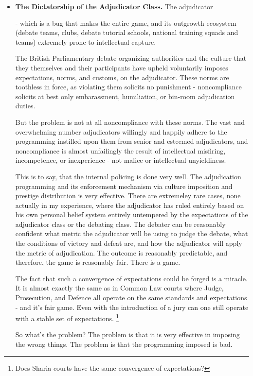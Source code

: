 \begin{itemize}
    \item \textbf{The Dictatorship of the Adjudicator Class.} The adjudicator 
    
    - which is a bug that makes the entire game, and its outgrowth ecosystem (debate teams, clubs, debate tutorial schools, national training squads and teams) extremely prone to intellectual capture.

    The British Parliamentary debate organizing authorities and the culture that they themselves and their participants have upheld voluntarily imposes expectations, norms, and customs, on the adjudicator. These norms are toothless in force, as violating them solicits no punishment - noncompliance solicits at best only embarassment, humiliation, or bin-room adjudication duties. 

    But the problem is not at all noncompliance with these norms. The vast and overwhelming number adjudicators willingly and happily adhere to the programming instilled upon them from senior and esteemed adjudicators, and noncompliance is almost unfailingly the result of intellectual misfiring, incompetence, or inexperience - not malice or intellectual unyieldiness.

    This is to say, that the internal policing is done very well. The adjudication programming and its enforcement mechanism via culture imposition and prestige distribution is very effective. There are extremeley rare cases, none actually in my experience, where the adjudicator has ruled entirely based on his own personal belief system entirely untempered by the expectations of the adjudicator class or the debating class. The debater can be reasonably confident what metric the adjudicator will be using to judge the debate, what the conditions of victory and defeat are, and how the adjudicator will apply the metric of adjudication. The outcome is reasonably predictable, and therefore, the game is reasonably fair. There is a game. 

    The fact that such a convergence of expectations could be forged is a miracle. It is almost exactly the same as in Common Law courts where Judge, Prosecution, and Defence all operate on the same standards and expectations - and it's fair game. Even with the introduction of a jury can one still operate with a stable set of expectations. 
    \footnote{Does Sharia courts have the same convergence of expectations?}
    
    So what's the problem? The problem is that it is very effective in imposing the wrong things. The problem is that the programming imposed is bad.



\end{itemize}

